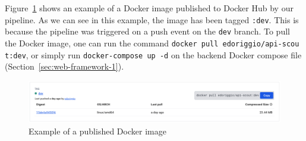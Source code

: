 \noindent Figure~\ref{fig:deployment-example} shows an example of a Docker image published to Docker Hub by our pipeline.
As we can see in this example, the image has been tagged \verb|:dev|.
This is because the pipeline was triggered on a push event on the \verb|dev| branch.
To pull the Docker image, one can run the command \verb|docker pull edoriggio/api-scou| \verb|t:dev|, or simply run \verb|docker-compose up -d| on the backend Docker compose file  (Section~\ref{sec:web-framework-1}).

\begin{figure}[h]
    \begin{center}
        \includegraphics[width=0.9\linewidth]{assets/png/deployment/dev-deployment}
    \end{center}

    \caption{Example of a published Docker image}
    \label{fig:deployment-example}
\end{figure}